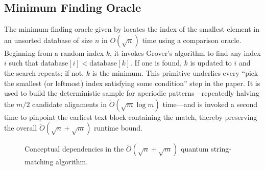 \documentclass[12pt]{IEEEtran}
\begin{document}
\subsection{Minimum Finding Oracle}
The minimum-finding oracle given by \cite[Durr \& Høyer]{durr1999quantumalgorithmfindingminimum} locates the index of the smallest element in an unsorted database of size \(n\) in \(O(\sqrt{n})\) time using a comparison oracle. Beginning from a random index \(k\), it invokes Grover's algorithm to find any index \(i\) such that \(\text{database}[i]<\text{database}[k]\). If one is found, \(k\) is updated to \(i\) and the search repeats; if not, \(k\) is the minimum. This primitive underlies every ``pick the smallest (or leftmost) index satisfying some condition'' step in the paper. It is used to build the deterministic sample for aperiodic patterns—repeatedly halving the \(m/2\) candidate alignments in \(\widetilde{O}(\sqrt{m}\log m)\) time—and is invoked a second time to pinpoint the earliest text block containing the match, thereby preserving the overall \(\widetilde{O}(\sqrt{n}+\sqrt{m})\) runtime bound.

\begin{figure*}[!t]
    \centering
    \caption{Conceptual dependencies in the $\widetilde{O}(\sqrt{n}+\sqrt{m})$ quantum string-matching algorithm.}
    \label{fig:quantum-string-matching}
\end{figure*}
\end{document}
